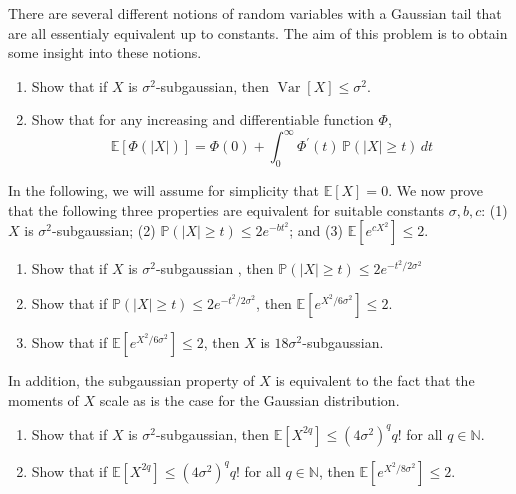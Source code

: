 \documentclass{article}
\DeclareMathOperator{\Var}{Var}
\theoremstyle{definition}
\theoremstyle{remark}
\theoremstyle{definition}
\begin{document}
  \begin{exercise}
  There are several different notions of random variables with a Gaussian tail that are all essentialy equivalent up to constants. The aim of this problem is to obtain some insight into these notions. 
  \begin{enumerate}
      \item Show that if $X$ is $\sigma^2$-subgaussian, then $\Var[X] \leq \sigma^2$. 
      \item Show that for any increasing and differentiable function $\Phi$, 
      \[\mathbb{E}[ \Phi(|X|)] = \Phi(0) + \int_0^\infty \Phi^\prime (t) \, \mathbb{P}(|X| \geq t) \, dt\]
  \end{enumerate}
  In the following, we will assume for simplicity that $\mathbb{E}[X] = 0$. We now prove that the following three properties are equivalent for suitable constants $\sigma, b, c$: (1) $X$ is $\sigma^2$-subgaussian; (2) $\mathbb{P}(|X| \geq t) \leq 2 e^{-b t^2}$; and (3) $\mathbb{E}[e^{c X^2}] \leq 2$. 
  \begin{enumerate}[resume]
      \item Show that if $X$ is $\sigma^2$-subgaussian , then $\mathbb{P}(|X| \geq t) \leq 2 e^{-t^2 / 2 \sigma^2}$ 
      \item Show that if $\mathbb{P}(|X| \geq t) \leq 2 e^{- t^2 / 2 \sigma^2}$, then $\mathbb{E}[e^{X^2 / 6 \sigma^2} ] \leq 2$. 
      \item Show that if $\mathbb{E}[e^{X^2 / 6 \sigma^2}] \leq 2$, then $X$ is $18 \sigma^2$-subgaussian. 
  \end{enumerate}
  In addition, the subgaussian property of $X$ is equivalent to the fact that the moments of $X$ scale as is the case for the Gaussian distribution. 
  \begin{enumerate}[resume]
      \item Show that if $X$ is $\sigma^2$-subgaussian, then $\mathbb{E}[X^{2q}] \leq (4 \sigma^2)^q q!$ for all $q \in \mathbb{N}$. 
      \item Show that if $\mathbb{E}[X^{2q}] \leq (4 \sigma^2)^q q!$ for all $q \in \mathbb{N}$, then $\mathbb{E}[e^{X^2 / 8 \sigma^2}] \leq 2$. 
  \end{enumerate}
  \end{exercise}
\end{document}
